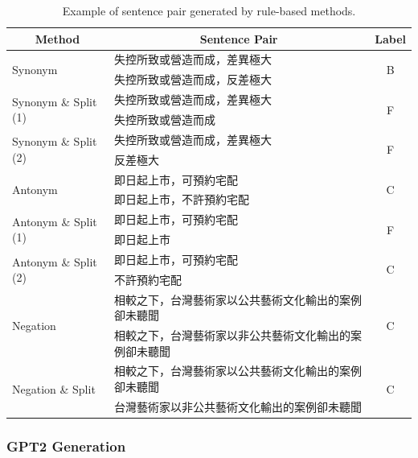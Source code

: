 \documentclass[12pt]{article}
\begin{document}
\begin{CJK*}{UTF8}{bkai}
\begin{spacing}{1.77}
\begin{table}[H]
  \centering
  \setlength{\extrarowheight}{-3pt}
  \begin{tabular}{|l|l|c|}
    \hline
    \multicolumn{1}{|c|}{Method} & \multicolumn{1}{c|}{Sentence Pair} & Label \\ \hline
    \multirow{2}{*}{Synonym} & 失控所致或營造而成，差異極大 & \multirow{2}{*}{B} \\ \cline{2-2}
    & 失控所致或營造而成，反差極大 &  \\ \hline
    \multirow{2}{*}{Synonym \& Split (1)} & 失控所致或營造而成，差異極大 & \multirow{2}{*}{F} \\ \cline{2-2}
    & 失控所致或營造而成 &  \\ \hline
    \multirow{2}{*}{Synonym \& Split (2)} & 失控所致或營造而成，差異極大 & \multirow{2}{*}{F} \\ \cline{2-2}
    & 反差極大 &  \\ \hline
    \multirow{2}{*}{Antonym} & 即日起上市，可預約宅配 & \multirow{2}{*}{C} \\ \cline{2-2}
    & 即日起上市，不許預約宅配 &  \\ \hline
    \multirow{2}{*}{Antonym \& Split (1)} & 即日起上市，可預約宅配 & \multirow{2}{*}{F} \\ \cline{2-2}
    & 即日起上市 &  \\ \hline
    \multirow{2}{*}{Antonym \& Split (2)} & 即日起上市，可預約宅配 & \multirow{2}{*}{C} \\ \cline{2-2}
    & 不許預約宅配 &  \\ \hline
    \multirow{2}{*}{Negation} & 相較之下，台灣藝術家以公共藝術文化輸出的案例卻未聽聞 & \multirow{2}{*}{C} \\ \cline{2-2}
    & 相較之下，台灣藝術家以非公共藝術文化輸出的案例卻未聽聞 &  \\ \hline
    \multirow{2}{*}{Negation \& Split} & 相較之下，台灣藝術家以公共藝術文化輸出的案例卻未聽聞 & \multirow{2}{*}{C} \\ \cline{2-2}
    & 台灣藝術家以非公共藝術文化輸出的案例卻未聽聞 &  \\ \hline
  \end{tabular}
  \caption{Example of sentence pair generated by rule-based methods.}
  \label{example:sim_nli_rule_based}
\end{table}

\subsubsection{GPT2 Generation}

\end{spacing}
\end{CJK*}
\end{document}
